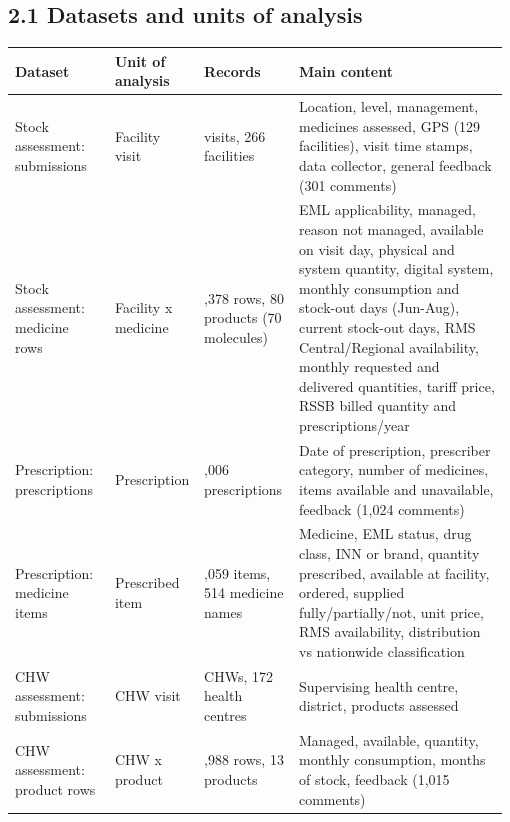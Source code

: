 \documentclass[10pt,a4paper]{article}
\begin{document}
\subsection{2.1 Datasets and units of analysis}
{\footnotesize\setlength{\tabcolsep}{3pt}
\begin{longtable}{>{\raggedright\arraybackslash}p{0.208\linewidth}>{\raggedright\arraybackslash}p{0.150\linewidth}>{\raggedright\arraybackslash}p{0.196\linewidth}>{\raggedright\arraybackslash}p{0.427\linewidth}}
\rowcolor{navy}\textbf{\color{white}Dataset} & \textbf{\color{white}Unit of analysis} & \textbf{\color{white}Records} & \textbf{\color{white}Main content} \\
\endhead
Stock assessment: submissions & Facility visit & 454 visits, 266 facilities & Location, level, management, medicines assessed, GPS (129 facilities), visit time stamps, data collector, general feedback (301 comments) \\
\rowcolor{band}Stock assessment: medicine rows & Facility x medicine & 14,378 rows, 80 products (70 molecules) & EML applicability, managed, reason not managed, available on visit day, physical and system quantity, digital system, monthly consumption and stock-out days (Jun-Aug), current stock-out days, RMS Central/Regional availability, monthly requested and delivered quantities, tariff price, RSSB billed quantity and prescriptions/year \\
Prescription: prescriptions & Prescription & 6,006 prescriptions & Date of prescription, prescriber category, number of medicines, items available and unavailable, feedback (1,024 comments) \\
\rowcolor{band}Prescription: medicine items & Prescribed item & 14,059 items, 514 medicine names & Medicine, EML status, drug class, INN or brand, quantity prescribed, available at facility, ordered, supplied fully/partially/not, unit price, RMS availability, distribution vs nationwide classification \\
CHW assessment: submissions & CHW visit & 175 CHWs, 172 health centres & Supervising health centre, district, products assessed \\
\rowcolor{band}CHW assessment: product rows & CHW x product & 1,988 rows, 13 products & Managed, available, quantity, monthly consumption, months of stock, feedback (1,015 comments) \\
\end{longtable}}
\end{document}

